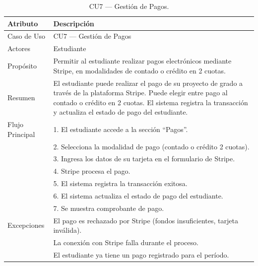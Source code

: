 \begin{table}[H]
\centering
\caption{CU7 — Gestión de Pagos.}
\label{tab:cu7}
\begin{tabular}{lp{10cm}}
\toprule
\textbf{Atributo} & \textbf{Descripción} \\
\midrule
Caso de Uso & CU7 — Gestión de Pagos \\
Actores & Estudiante \\
Propósito & Permitir al estudiante realizar pagos electrónicos mediante Stripe, en modalidades de contado o crédito en 2 cuotas. \\
Resumen & El estudiante puede realizar el pago de su proyecto de grado a través de la plataforma Stripe. Puede elegir entre pago al contado o crédito en 2 cuotas. El sistema registra la transacción y actualiza el estado de pago del estudiante. \\
Flujo Principal & 1. El estudiante accede a la sección ``Pagos''. \\
& 2. Selecciona la modalidad de pago (contado o crédito 2 cuotas). \\
& 3. Ingresa los datos de su tarjeta en el formulario de Stripe. \\
& 4. Stripe procesa el pago. \\
& 5. El sistema registra la transacción exitosa. \\
& 6. El sistema actualiza el estado de pago del estudiante. \\
& 7. Se muestra comprobante de pago. \\
Excepciones & El pago es rechazado por Stripe (fondos insuficientes, tarjeta inválida). \\
& La conexión con Stripe falla durante el proceso. \\
& El estudiante ya tiene un pago registrado para el período. \\
\bottomrule
\end{tabular}
\end{table}


